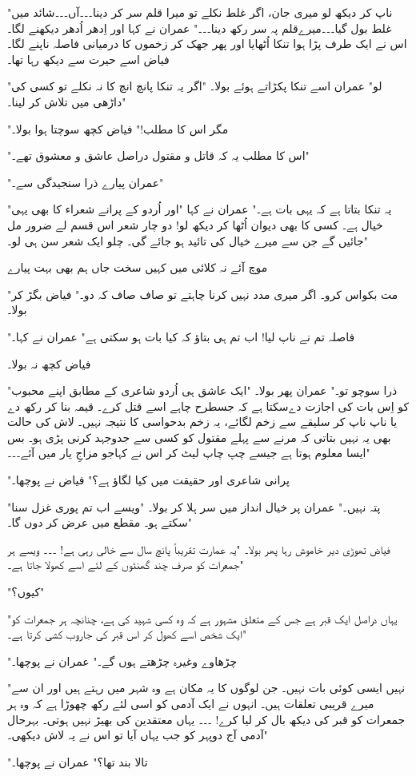\centerline{}
\break


\beginR
\body

"ناپ کر دیکھ لو میری جان، اگر غلط نکلے تو میرا قلم سر کر دینا۔۔۔آں۔۔۔شائد میں غلط بول گیا۔۔۔میرےقلم پہ سر رکھ دینا۔۔۔" عمران نے کہا اور اِدھر اُدھر دیکھنے لگا۔ اس نے ایک طرف پڑا ہوا تنکا اُٹھایا اور پھر جھک کر زخموں کا درمیانی فاصلہ ناپنے لگا۔ فیاض اسے حیرت سے دیکھ رہا تھا۔

"لو" عمران اسے تنکا پکڑاتے ہوئے بولا۔ "اگر یہ تنکا پانچ انچ کا نہ نکلے تو کسی کی داڑھی میں تلاش کر لینا۔"

"مگر اس کا مطلب!" فیاض کچھ سوچتا ہوا بولا۔

"اس کا مطلب یہ کہ قاتل و مقتول دراصل عاشق و معشوق تھے۔"

"عمران پیارے ذرا سنجیدگی سے۔"

"یہ تنکا بتاتا ہے کہ یہی بات ہے۔" عمران نے کہا "اور اُردو کے پرانے شعراء کا بھی یہی خیال ہے۔ کسی کا بھی دیوان اُٹھا کر دیکھ لو! دو چار شعر اس قسم لے ضرور مل جائیں گے جن سے میرے خیال کی تائید ہو جائے گی۔ چلو ایک شعر سن ہی لو۔"

موچ آئے نہ کلائی میں کہیں	\hfil سخت جاں ہم بھی بہت پیارے

"مت بکواس کرو۔ اگر میری مدد نہیں کرنا چاہتے تو صاف صاف کہ دو۔" فیاض بگڑ کر بولا۔

"فاصلہ تم نے ناپ لیا! اب تم ہی بتاؤ کہ کیا بات ہو سکتی ہے" عمران نے کہا۔

فیاض کچھ نہ بولا۔

"ذرا سوچو تو۔" عمران پھر بولا۔ "ایک عاشق ہی اُردو شاعری کے مطابق اپنے محبوب کو اِس بات کی اجازت دےسکتا ہے کہ جسطرح چاہے اسے قتل کرے۔ قیمہ بنا کر رکھ دے یا ناپ ناپ کر سلیقے سے زخم لگائے، یہ زخم بدحواسی کا نتیجہ نہیں۔ لاش کی حالت بھی یہ نہیں بتاتی کہ مرنے سے پہلے مقتول کو کسی سے جدوجہد کرنی پڑی ہو۔ بس ایسا معلوم ہوتا ہے جیسے چپ چاپ لیٹ کر اس نے کہاجو مزاجِ یار میں آئے۔۔۔"

"پرانی شاعری اور حقیقت میں کیا لگاؤ ہے؟" فیاض نے پوچھا۔

"پتہ نہیں۔" عمران پر خیال انداز میں سر ہلا کر بولا۔ "ویسے اب تم پوری غزل سنا سکتے ہو۔ مقطع میں عرض کر دوں گا۔"

فیاض تھوڑی دیر خاموش رہا پھر بولا۔ "یہ عمارت تقریباً پانچ سال سے خالی رہی ہے! ۔۔۔ ویسے ہر جمعرات کو صرف چند گھنٹوں کے لئے اسے کھولا جاتا ہے۔"

"کیوں؟"

"یہاں دراصل ایک قبر ہے جس کے متعلق مشہور ہے کہ وہ کسی شہید کی ہے، چنانچہ ہر جمعرات کو ایک شخص اسے کھول کر اس قبر کی جاروب کشی کرتا ہے۔"

"چڑھاوے وغیرہ چڑھتے ہوں گے۔" عمران نے پوچھا۔

"نہیں ایسی کوئی بات نہیں۔ جن لوگوں کا یہ مکان ہے وہ شہر میں رہتے ہیں اور ان سے میرے قریبی تعلقات ہیں۔ انہوں نے ایک آدمی کو اسی لئے رکھ چھوڑا ہے کہ وہ ہر جمعرات کو قبر کی دیکھ بال کر لیا کرے! ۔۔۔ یہاں معتقدین کی بھیڑ نہیں ہوتی۔ بہرحال آدمی آج دوپہر کو جب یہاں آیا تو اس نے یہ لاش دیکھی۔"

"تالا بند تھا؟" عمران نے پوچھا۔




\endR

\bye